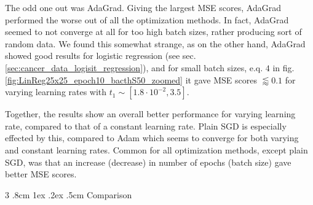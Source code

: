 \documentclass[%
reprint,s
amsmath,amssymb,
aps,
]{revtex4-2}
\makeatletter
\renewcommand{\subsubsection}{%
	\@startsection
	{subsubsection}%
	{3}%
	{\z@}%
	{.8cm \@plus1ex \@minus .2ex}%
	{.5cm}%
	{\normalfont\small\centering}%
}
\makeatother
\begin{document}
The odd one out was AdaGrad. Giving the largest MSE scores, AdaGrad performed the worse out of all the optimization methods. In fact, AdaGrad seemed to not converge at all for too high batch sizes, rather producing sort of random data. We found this somewhat strange, as on the other hand, AdaGrad showed good results for logistic regression (see sec. \ref{sec:cancer_data_logisit_regression}), and for small batch sizes, e.q. \(4\) in fig. \ref{fig:LinReg25x25_epoch10_bacthS50_zoomed} it gave MSE scores \(\lessapprox 0.1\) for varying learning rates with \(t_1\sim[1.8\cdot 10^{-2}, 3.5]\).

Together, the results show an overall better performance for varying learning rate, compared to that of a constant learning rate. Plain SGD is especially effected by this, compared to Adam which seems to converge for both varying and constant learning rates. Common for all optimization methods, except plain SGD, was that an increase (decrease) in number of epochs (batch size) gave better MSE scores.

\subsubsection{Comparison}
\end{document}
